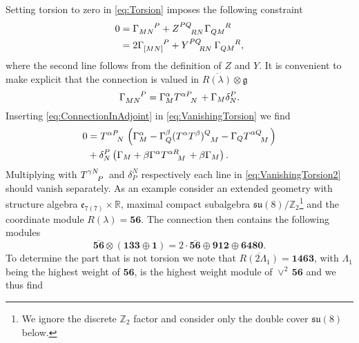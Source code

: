 Setting torsion to zero in \eqref{eq:Torsion} imposes the following constraint 
\begin{equation}\label{eq:VanishingTorsion}
    \begin{aligned}
        0 &= \tensor{\Gamma}{_{MN}^P} +\tensor{Z}{^{PQ}_{RN}}\tensor{\Gamma}{_{QM}^R}\\
          &= 2\tensor{\Gamma}{_{[MN]}^P} +\tensor{Y}{^{PQ}_{RN}}\tensor{\Gamma}{_{QM}^R},
    \end{aligned}
\end{equation}
where the second line follows from the definition of $Z$ and $Y$. It is convenient to make explicit that the connection is valued in $\overbar{R(\lambda)}\otimes\mathfrak{g}$
\begin{equation}\label{eq:ConnectionInAdjoint}
    \tensor{\Gamma}{_{MN}^P} = \Gamma_M^\alpha\tensor{T}{^\alpha ^P_N}+\Gamma_M\delta^P_N.
\end{equation}
Inserting \eqref{eq:ConnectionInAdjoint} in \eqref{eq:VanishingTorsion} we find 
\begin{equation}\label{eq:VanishingTorsion2}
    \begin{aligned}
    0 &= \tensor{T}{^{\alpha P}_N}\left(\Gamma_M^\alpha-\Gamma_Q^\beta(T^\alpha T^\beta)\tensor{}{^Q_M}-\Gamma_Q\tensor{T}{^{\alpha Q}_M}\right)\\
    &+ \delta^P_N\left(\Gamma_M+\beta\Gamma^\alpha\tensor{T}{^{\alpha R}_M}+\beta\Gamma_M\right).
    \end{aligned}
\end{equation}
Multiplying with $\tensor{T}{^{\gamma N}_P}$ and $\delta^N_P$ respectively each line in \eqref{eq:VanishingTorsion2} should vanish separately.
As an example consider an extended geometry with structure algebra $\mathfrak{e}_{7(7)}\times\mathbb{R}$, maximal compact subalgebra $\mathfrak{su}(8)/\mathbb{Z}_2$\footnote{We ignore the discrete $\mathbb{Z}_2$ factor and consider only the double cover $\mathfrak{su}(8)$ below.} and the coordinate module $R(\lambda)=\mathbf{56}$. The connection then contains the following modules 
\begin{equation}
    \overbar{\mathbf{56}}\otimes\left(\mathbf{133}\oplus\mathbf{1}\right) = 2\cdot \overbar{\mathbf{56}}\oplus\mathbf{912}\oplus\mathbf{6480}.
\end{equation}
To determine the part that is not torsion we note that $\overbar{R(2\Lambda_1)}=\mathbf{1463}$, with $\Lambda_1$ being the highest weight of $\mathbf{56}$, is the highest weight module of $\vee^2\,\mathbf{56}$ and we thus find 
